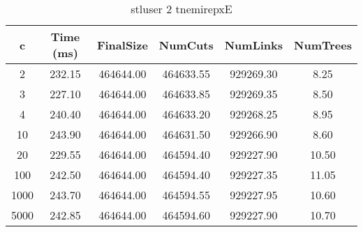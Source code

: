 \begin{table}[ht]
\centering
\caption{stluser 2 tnemirepxE}
\begin{tabular}{|c|c|c|c|c|c|}
\hline
c & Time (ms) & FinalSize & NumCuts   & NumLinks  & NumTrees  \\
\hline
2    & 232.15 & 464644.00 & 464633.55 & 929269.30 & 8.25 \\ 
3    & 227.10 & 464644.00 & 464633.85 & 929269.35 & 8.50 \\ 
4    & 240.40 & 464644.00 & 464633.20 & 929268.25 & 8.95 \\ 
10   & 243.90 & 464644.00 & 464631.50 & 929266.90 & 8.60 \\ 
20   & 229.55 & 464644.00 & 464594.40 & 929227.90 & 10.50 \\ 
100  & 242.50 & 464644.00 & 464594.40 & 929227.35 & 11.05 \\ 
1000 & 243.70 & 464644.00 & 464594.55 & 929227.95 & 10.60 \\ 
5000 & 242.85 & 464644.00 & 464594.60 & 929227.90 & 10.70 \\ 
\hline
\end{tabular}
\end{table}
